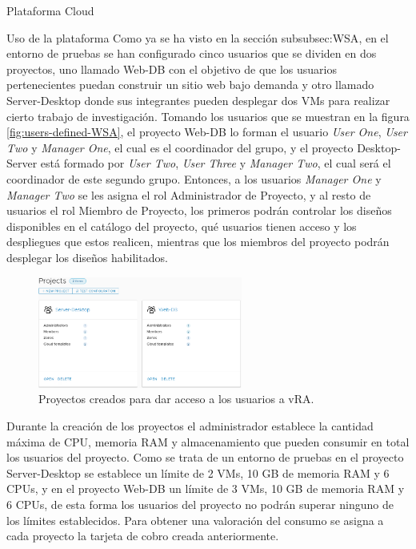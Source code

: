 \begin{subsection}{Plataforma Cloud}
\begin{subsubsection}{Uso de la plataforma}
        Como ya se ha visto en la sección \refname{subsubsec:WSA}, en el entorno de pruebas se han configurado cinco usuarios que se dividen en dos proyectos, uno llamado Web-DB con el objetivo de que los usuarios pertenecientes puedan construir un sitio web bajo demanda y otro llamado Server-Desktop donde sus integrantes pueden desplegar dos VMs para realizar cierto trabajo de investigación. Tomando los usuarios que se muestran en la figura \ref{fig:users-defined-WSA}, el proyecto Web-DB lo forman el usuario \textit{User One}, \textit{User Two} y \textit{Manager One}, el cual es el coordinador del grupo, y el proyecto Desktop-Server está formado por \textit{User Two}, \textit{User Three} y \textit{Manager Two}, el cual será el coordinador de este segundo grupo. Entonces, a los usuarios \textit{Manager One} y \textit{Manager Two} se les asigna el rol Administrador de Proyecto, y al resto de usuarios el rol Miembro de Proyecto, los primeros podrán controlar los diseños disponibles en el catálogo del proyecto, qué usuarios tienen acceso y los despliegues que estos realicen, mientras que los miembros del proyecto podrán desplegar los diseños habilitados.
        \begin{figure}[h]
            \centering
            \includegraphics[width=0.6\textwidth]{imaxes/pruebaconcepto/vrealize/projects-vRA.png}
            \caption{Proyectos creados para dar acceso a los usuarios a vRA.}
            \label{fig:projects-vra}
        \end{figure}
        \FloatBarrier
        Durante la creación de los proyectos el administrador establece la cantidad máxima de CPU, memoria RAM y almacenamiento que pueden consumir en total los usuarios del proyecto. Como se trata de un entorno de pruebas en el proyecto Server-Desktop se establece un límite de 2 VMs, 10 GB de memoria RAM y 6 CPUs, y en el proyecto Web-DB un límite de 3 VMs, 10 GB de memoria RAM y 6 CPUs, de esta forma los usuarios del proyecto no podrán superar ninguno de los límites establecidos. Para obtener una valoración del consumo se asigna a cada proyecto la tarjeta de cobro creada anteriormente.

\end{subsubsection}
\end{subsection}
